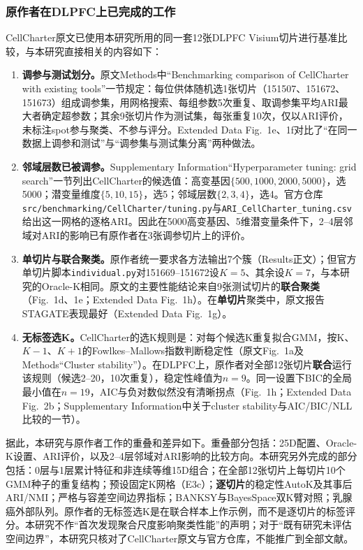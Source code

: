 \subsubsection{原作者在DLPFC上已完成的工作}
\label{subsubsec:cc-prior-dlpfc-rev-p0}
CellCharter原文已使用本研究所用的同一套12张DLPFC Visium切片进行基准比较\cite{varrone2024}，与本研究直接相关的内容如下：
\begin{enumerate}
  \item \textbf{调参与测试划分。}原文Methods中“Benchmarking comparison of CellCharter with existing tools”一节规定：每位供体随机选1张切片（151507、151672、151673）组成调参集，用网格搜索、每组参数5次重复、取调参集平均ARI最大者确定超参数；其余9张切片作为测试集，每张重复10次，仅以ARI评价，未标注spot参与聚类、不参与评分。Extended Data Fig.~1e、1f对比了“在同一数据上调参和测试”与“调参集与测试集分离”两种做法。
  \item \textbf{邻域层数已被调参。}Supplementary Information“Hyperparameter tuning: grid search”一节列出CellCharter的候选值：高变基因$\{500,1000,2000,5000\}$，选5000；潜变量维度$\{5,10,15\}$，选5；邻域层数$\{2,3,4\}$，选4。官方仓库\texttt{src/benchmarking/CellCharter/tuning.py}与\texttt{ARI\_CellCharter\_tuning.csv}给出这一网格的逐格ARI\cite{cellcharteranalyses2024}。因此在5000高变基因、5维潜变量条件下，2--4层邻域对ARI的影响已有原作者在3张调参切片上的评价。
  \item \textbf{单切片与联合聚类。}原作者统一要求各方法输出7个簇（Results正文）；但官方单切片脚本\texttt{individual.py}对151669--151672设$K=5$、其余设$K=7$，与本研究的Oracle-K相同。原文的主要性能结论来自9张测试切片的\textbf{联合聚类}（Fig.~1d、1e；Extended Data Fig.~1h）。在\textbf{单切片}聚类中，原文报告STAGATE表现最好（Extended Data Fig.~1g）\cite{dong2022stagate}。
  \item \textbf{无标签选K。}CellCharter的选K规则是：对每个候选K重复拟合GMM，按K、$K-1$、$K+1$的Fowlkes--Mallows指数\cite{fowlkes1983}判断稳定性（原文Fig.~1a及Methods“Cluster stability”）。在DLPFC上，原作者对全部12张切片\textbf{联合}运行该规则（候选2--20，10次重复），稳定性峰值为$n=9$。同一设置下BIC的全局最小值在$n=19$，AIC与负对数似然没有清晰拐点（Fig.~1h；Extended Data Fig.~2b；Supplementary Information中关于cluster stability与AIC/BIC/NLL比较的一节）。
\end{enumerate}

据此，本研究与原作者工作的重叠和差异如下。重叠部分包括：25D配置、Oracle-K设置、ARI评价，以及2--4层邻域对ARI影响的比较方向。本研究另外完成的部分包括：0层与1层累计特征和非连续等维15D组合；在全部12张切片上每切片10个GMM种子的重复结构；预设固定K网格（E3c）；\textbf{逐切片}的稳定性AutoK及其事后ARI/NMI；严格与容差空间边界指标；BANKSY与BayesSpace双K臂对照；乳腺癌外部队列。原作者的无标签选K是在联合样本上作示例，而不是逐切片的标签评分。本研究不作“首次发现聚合尺度影响聚类性能”的声明；对于“既有研究未评估空间边界”，本研究只核对了CellCharter原文与官方仓库，不能推广到全部文献。

